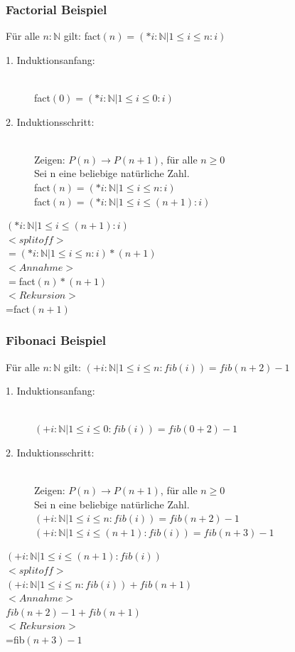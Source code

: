 \documentclass[a4paper,10pt]{article}
\newcommand{\NN}{\mathbb{N}} %
\newcommand{\ra}{\rightarrow}
\begin{document}
\subsubsection{Factorial Beispiel}
F\"ur alle $n:\NN$ gilt: fact$(n)=(*i:\NN | 1 \leq i \leq n : i)$
\begin{description}
	\item[1. Induktionsanfang:] \hfill \\
		fact$(0) = (*i : \NN | 1 \leq i \leq 0 : i)$
	\item[2. Induktionsschritt:] \hfill \\
		Zeigen: $P(n)\ra P(n+1)$, f\"ur alle $n \geq 0$ \\ 
		Sei n eine beliebige nat\"urliche Zahl. \\
		fact$(n) = (*i : \NN | 1 \leq i \leq n : i)$ \\
		fact$(n) = (*i : \NN | 1 \leq i \leq (n+1) : i)$
\end{description}
$(*i : \NN | 1 \leq i \leq (n+1) : i)$ \\ $<splitoff>$ \\
$=(*i : \NN | 1 \leq i \leq n : i) * (n+1)$ \\ $<Annahme>$ \\
$=$fact$(n)*(n+1)$ \\ $<Rekursion>$ \\
=fact$(n+1)$

\subsubsection{Fibonaci Beispiel}
F\"ur alle $n:\NN$ gilt: $(+ i: \NN | 1 \leq i \leq n : fib(i))=fib(n+2)-1$
\begin{description}
	\item[1. Induktionsanfang:] \hfill \\
		$(+ i: \NN | 1 \leq i \leq 0 : fib(i))=fib(0+2)-1$
	\item[2. Induktionsschritt:] \hfill \\
		Zeigen: $P(n)\ra P(n+1)$, f\"ur alle $n \geq 0$ \\ 
		Sei n eine beliebige nat\"urliche Zahl. \\
		$(+ i: \NN | 1 \leq i \leq n : fib(i))=fib(n+2)-1$ \\
		$(+ i: \NN | 1 \leq i \leq (n+1) : fib(i))=fib(n+3)-1$
\end{description}
$(+ i: \NN | 1 \leq i \leq (n+1) : fib(i))$ \\ $<splitoff>$ \\
$(+ i: \NN | 1 \leq i \leq n: fib(i)) +fib(n+1) $  \\ $<Annahme>$ \\
$fib(n+2)-1 + fib(n+1) $  \\ $<Rekursion>$ \\
=fib$(n+3)-1$
\end{document}
